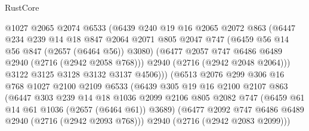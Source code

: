 \begin{lexlean}{RustCore}
\begin{coremodule}
                              @1027
                              @2065
                              @2074
                              @6533
                              (@6439
                                @240
                                @19
                                @16
                                @2065
                                @2072
                                @863
                                (@6447
                                  @234
                                  @239
                                  @14
                                  @18
                                  @847
                                  @2064
                                  @2071
                                  @805
                                  @2047
                                  @747
                                  (@6459 @56 @14 @56 @847 (@2657 (@6464 @56)) @3080)
                                  (@6477 @2057 @747 @6486 @6489 @2940 (@2716 (@2942 @2058 @768)))
                                  @2940
                                  (@2716 (@2942 @2048 @2064)))
                                @3122
                                @3125
                                @3128
                                @3132
                                @3137
                                @4506)))
                          (@6513
                            @2076
                            @299
                            @306
                            @16
                            @768
                            @1027
                            @2100
                            @2109
                            @6533
                            (@6439
                              @305
                              @19
                              @16
                              @2100
                              @2107
                              @863
                              (@6447
                                @303
                                @239
                                @14
                                @18
                                @1036
                                @2099
                                @2106
                                @805
                                @2082
                                @747
                                (@6459 @61 @14 @61 @1036 (@2657 (@6464 @61)) @3689)
                                (@6477 @2092 @747 @6486 @6489 @2940 (@2716 (@2942 @2093 @768)))
                                @2940
                                (@2716 (@2942 @2083 @2099)))

\end{coremodule}
\end{lexlean}
